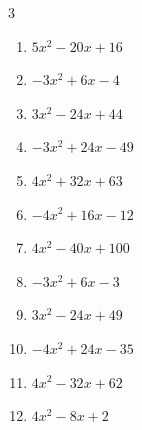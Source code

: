 


\setcounter{quesnum}{30}

\begin{multicols}{3}
\begin{enumerate}
  \itemsep=30pt
  \item $5x^{2}-20x+16$


  \item $-3x^{2}+6x-4$


  \item $3x^{2}-24x+44$


  \item $-3x^{2}+24x-49$


  \item $4x^{2}+32x+63$


  \item $-4x^{2}+16x-12$


  \item $4x^{2}-40x+100$


  \item $-3x^{2}+6x-3$


  \item $3x^{2}-24x+49$


  \item $-4x^{2}+24x-35$


\columnbreak %

  \item $4x^{2}-32x+62$


  \item $4x^{2}-8x+2$


\end{enumerate}
\end{multicols}
